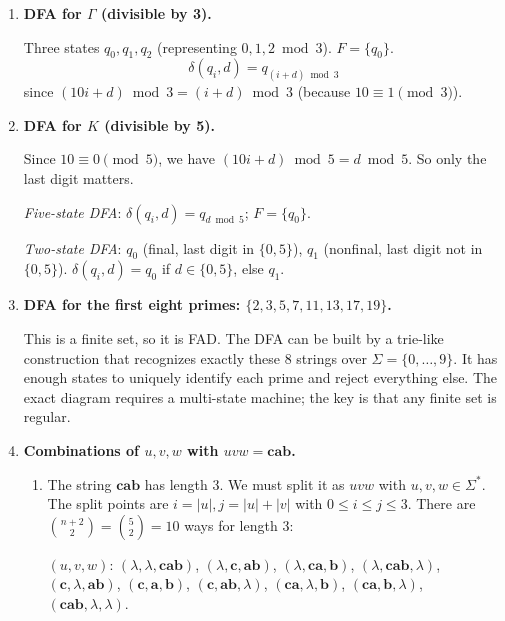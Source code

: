 \documentclass[11pt]{book}
\begin{document}
\begin{enumerate}[{1.}1.]
\item \textbf{DFA for $\Gamma$ (divisible by 3).}

Three states $q_0,q_1,q_2$ (representing $0,1,2\bmod 3$). $F=\{q_0\}$.
\[
\delta(q_i,d) = q_{(i+d)\bmod 3}
\]
since $(10i+d)\bmod 3 = (i+d)\bmod 3$ (because $10\equiv 1\pmod 3$).

\item \textbf{DFA for $K$ (divisible by 5).}

Since $10\equiv 0\pmod 5$, we have $(10i+d)\bmod 5 = d\bmod 5$. So only the last digit matters.

\textit{Five-state DFA}: $\delta(q_i,d) = q_{d\bmod 5}$; $F=\{q_0\}$.

\textit{Two-state DFA}: $q_0$ (final, last digit in $\{0,5\}$), $q_1$ (nonfinal, last digit not in $\{0,5\}$). $\delta(q_i,d)=q_0$ if $d\in\{0,5\}$, else $q_1$.

\item \textbf{DFA for the first eight primes: $\{2,3,5,7,11,13,17,19\}$.}

This is a finite set, so it is FAD. The DFA can be built by a trie-like construction that recognizes exactly these 8 strings over $\Sigma=\{0,\ldots,9\}$. It has enough states to uniquely identify each prime and reject everything else. The exact diagram requires a multi-state machine; the key is that any finite set is regular.

\item \textbf{Combinations of $u,v,w$ with $uvw = \mathbf{cab}$.}

\begin{enumerate}
\item The string $\mathbf{cab}$ has length 3. We must split it as $uvw$ with $u,v,w\in\Sigma^*$. The split points are $i=|u|,j=|u|+|v|$ with $0\leq i\leq j\leq 3$. There are $\binom{n+2}{2}=\binom{5}{2}=10$ ways for length 3:

$(u,v,w)$: $(\lambda,\lambda,\mathbf{cab})$, $(\lambda,\mathbf{c},\mathbf{ab})$, $(\lambda,\mathbf{ca},\mathbf{b})$, $(\lambda,\mathbf{cab},\lambda)$, $(\mathbf{c},\lambda,\mathbf{ab})$, $(\mathbf{c},\mathbf{a},\mathbf{b})$, $(\mathbf{c},\mathbf{ab},\lambda)$, $(\mathbf{ca},\lambda,\mathbf{b})$, $(\mathbf{ca},\mathbf{b},\lambda)$, $(\mathbf{cab},\lambda,\lambda)$.


\end{enumerate}
\end{enumerate}
\end{document}
